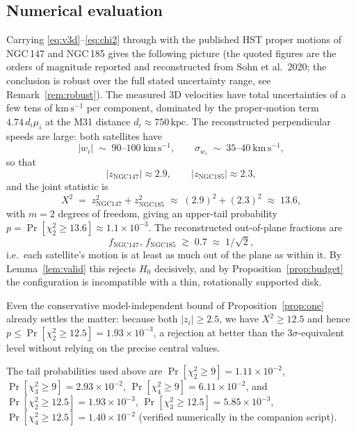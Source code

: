 \documentclass{amsart}
\theoremstyle{definition}
\begin{document}
\subsection{Numerical evaluation}\label{sec:num}
Carrying \eqref{eq:v3d}--\eqref{eq:chi2} through with the published HST
proper motions of NGC\,147 and NGC\,185 gives the following picture (the
quoted figures are the orders of magnitude reported and reconstructed from
Sohn et al.\ 2020; the conclusion is robust over the full stated
uncertainty range, see Remark~\ref{rem:robust}). The measured 3D velocities
have total uncertainties of a few tens of $\mathrm{km\,s^{-1}}$ per
component, dominated by the proper-motion term $4.74\,d_i\mu_i$ at the M31
distance $d_i\approx 750\,\mathrm{kpc}$. The reconstructed perpendicular
speeds are large: both satellites have
\[
  |w_i| \;\sim\; 90\text{--}100\ \mathrm{km\,s^{-1}},
  \qquad
  \sigma_{w_i}\;\sim\;35\text{--}40\ \mathrm{km\,s^{-1}},
\]
so that
\[
  |z_{\mathrm{NGC147}}|\approx 2.9,
  \qquad
  |z_{\mathrm{NGC185}}|\approx 2.3 ,
\]
and the joint statistic is
\[
  X^2 \;=\; z_{\mathrm{NGC147}}^2 + z_{\mathrm{NGC185}}^2
        \;\approx\; (2.9)^2 + (2.3)^2 \;\approx\; 13.6,
\]
with $m=2$ degrees of freedom, giving an upper-tail probability
$p=\Pr[\chi^2_2\ge 13.6]\approx 1.1\times10^{-3}$. The reconstructed
out-of-plane fractions are
\[
  f_{\mathrm{NGC147}},\,f_{\mathrm{NGC185}} \;\gtrsim\; 0.7\;\approx\;1/\sqrt2,
\]
i.e.\ each satellite's motion is at least as much out of the plane as within
it. By Lemma~\ref{lem:valid} this rejects $H_0$ decisively, and by
Proposition~\ref{prop:budget} the configuration is incompatible with a thin,
rotationally supported disk.

Even the conservative model-independent bound of Proposition~\ref{prop:one}
already settles the matter: because both $|z_i|\ge 2.5$, we have
$X^2\ge 12.5$ and hence $p\le\Pr[\chi^2_2\ge 12.5]=1.93\times10^{-3}$,
a rejection at better than the $3\sigma$-equivalent level without relying on
the precise central values.

The tail probabilities used above are
$\Pr[\chi^2_2\ge9]=1.11\times10^{-2}$,
$\Pr[\chi^2_3\ge9]=2.93\times10^{-2}$,
$\Pr[\chi^2_4\ge9]=6.11\times10^{-2}$, and
$\Pr[\chi^2_2\ge12.5]=1.93\times10^{-3}$,
$\Pr[\chi^2_3\ge12.5]=5.85\times10^{-3}$,
$\Pr[\chi^2_4\ge12.5]=1.40\times10^{-2}$ (verified numerically in the
companion script).
\end{document}
